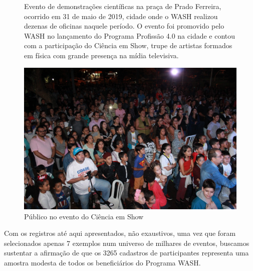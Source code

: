 \documentclass[
12pt,		%
openright,	%
twoside,  %
a4paper,			%
chapter=TITLE,		%
english,			%
french,				%
spanish,			%
brazil				%
]{USPSC-classe/USPSC}
\begin{document}
\begin{figure}[max size={\textwidth}{\textheight}]
\begin{minipage}[b]{0.4\linewidth}
                \caption{Evento de demonstra\c{c}\~oes cient\'{i}ficas na pra\c{c}a de Prado Ferreira, ocorrido em 31 de maio de 2019, cidade onde o WASH realizou dezenas de oficinas naquele per\'{i}odo. O evento foi promovido pelo WASH no lan\c{c}amento do Programa Profiss\~ao 4.0 na cidade e contou com a participa\c{c}\~ao do Ci\^encia em Show, trupe de artistas formados em f\'{i}sica com grande presen\c{c}a na m\'{i}dia televisiva.}
                \label{d76eb1e41d3d1e1394e18aafa3beb2bc3ad09471}
\end{minipage}
\hspace{0.5cm}
\end{figure}










\captionsetup{format=plain}
\begin{figure}[max size={\textwidth}{\textheight}]

\centering


\begin{minipage}[b]{0.4\linewidth}
        \centering
                \includegraphics[width=1.0\linewidth]{../../imagens/Ciencia-Prado-publico.jpeg}
                \caption{P\'ublico no evento do Ci\^encia em Show}
                \label{7b56c85cc265fcbf261a3bc788ae1e4619b70725}
\end{minipage}%
\hspace{0.5cm}
\end{figure}



Com os registros at\'e aqui apresentados, n\~ao exaustivos, uma vez que foram selecionados apenas 7 exemplos num universo de milhares de eventos, buscamos sustentar a afirma\c{c}\~ao de que os 3265 cadastros de participantes representa uma amostra modesta de todos os benefici\'arios do Programa WASH.
\end{document}
